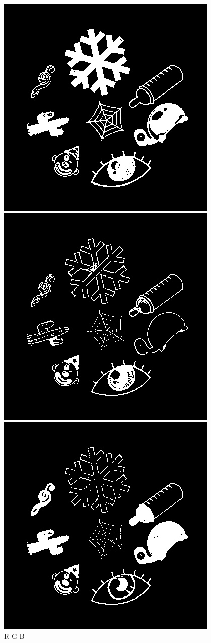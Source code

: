 \documentclass[10pt,a4paper]{article}
\begin{document}
\begin{center}
\includegraphics[scale=0.25]{2.1/red1.jpg}
\includegraphics[scale=0.25]{2.1/green1.jpg}
\includegraphics[scale=0.25]{2.1/blue1.jpg}\\
 R \quad \qquad \qquad \qquad \qquad G \qquad \qquad \qquad \qquad \quad B
\end{center}
\end{document}
